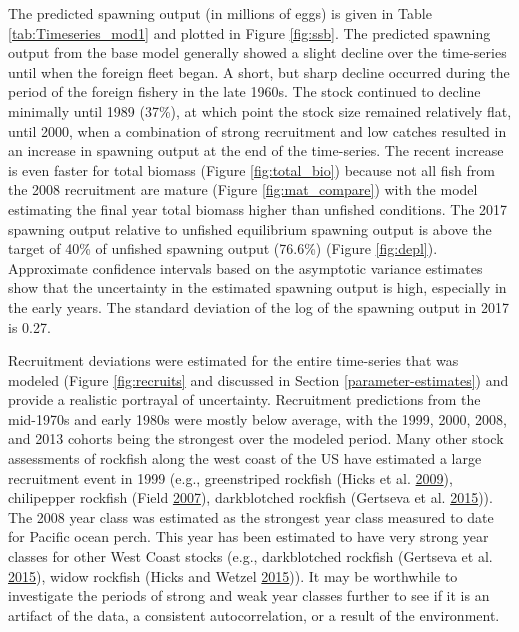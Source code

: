 \documentclass[12pt,]{article}
\begin{document}
The predicted spawning output (in millions of eggs) is given in Table
\ref{tab:Timeseries_mod1} and plotted in Figure \ref{fig:ssb}. The
predicted spawning output from the base model generally showed a slight
decline over the time-series until when the foreign fleet began. A
short, but sharp decline occurred during the period of the foreign
fishery in the late 1960s. The stock continued to decline minimally
until 1989 (37\%), at which point the stock size remained relatively
flat, until 2000, when a combination of strong recruitment and low
catches resulted in an increase in spawning output at the end of the
time-series. The recent increase is even faster for total biomass
(Figure \ref{fig:total_bio}) because not all fish from the 2008
recruitment are mature (Figure \ref{fig:mat_compare}) with the model
estimating the final year total biomass higher than unfished conditions.
The 2017 spawning output relative to unfished equilibrium spawning
output is above the target of 40\% of unfished spawning output (76.6\%)
(Figure \ref{fig:depl}). Approximate confidence intervals based on the
asymptotic variance estimates show that the uncertainty in the estimated
spawning output is high, especially in the early years. The standard
deviation of the log of the spawning output in 2017 is 0.27.

Recruitment deviations were estimated for the entire time-series that
was modeled (Figure \ref{fig:recruits} and discussed in Section
\ref{parameter-estimates}) and provide a realistic portrayal of
uncertainty. Recruitment predictions from the mid-1970s and early 1980s
were mostly below average, with the 1999, 2000, 2008, and 2013 cohorts
being the strongest over the modeled period. Many other stock
assessments of rockfish along the west coast of the US have estimated a
large recruitment event in 1999 (e.g., greenstriped rockfish (Hicks et
al. \protect\hyperlink{ref-hicks_status_2009}{2009}), chilipepper
rockfish (Field \protect\hyperlink{ref-field_status_2007}{2007}),
darkblotched rockfish (Gertseva et al.
\protect\hyperlink{ref-gertseva_status_2015}{2015})). The 2008 year
class was estimated as the strongest year class measured to date for
Pacific ocean perch. This year has been estimated to have very strong
year classes for other West Coast stocks (e.g., darkblotched rockfish
(Gertseva et al. \protect\hyperlink{ref-gertseva_status_2015}{2015}),
widow rockfish (Hicks and Wetzel
\protect\hyperlink{ref-hicks_status_2015}{2015})). It may be worthwhile
to investigate the periods of strong and weak year classes further to
see if it is an artifact of the data, a consistent autocorrelation, or a
result of the environment.
\end{document}
